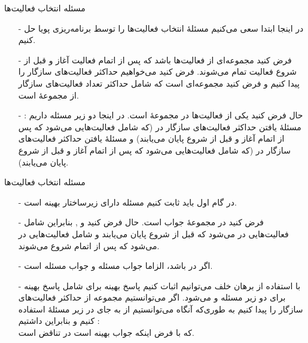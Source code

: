 \begin{frame}{‌مسئله انتخاب فعالیت‌ها}
\begin{itemize}\itemr
\item[-]
در اینجا ابتدا سعی می‌کنیم مسئلهٔ انتخاب فعالیت‌ها را توسط برنامه‌ریزی پویا حل کنیم.
\item[-]
 فرض کنید
مجموعه‌ای از فعالیت‌ها باشد که پس از اتمام فعالیت
آغاز
و قبل از شروع فعالیت
تمام می‌شوند.
فرض کنید می‌خواهیم حداکثر فعالیت‌های سازگار
را پیدا کنیم و فرض کنید
مجموعه‌ای است که شامل حداکثر تعداد فعالیت‌های سازگار از مجموعهٔ
است.
\item[-]
حال فرض کنید
یکی از فعالیت‌ها در مجموعهٔ
است. در اینجا دو زیر مسئله داریم : مسئلهٔ یافتن حداکثر فعالیت‌های سازگار در
(که شامل فعالیت‌هایی می‌شود که پس از اتمام
آغاز
و قبل از شروع
پایان می‌یابند) و مسئلهٔ یافتن حداکثر فعالیت‌های سازگار در
(که شامل فعالیت‌هایی می‌شود که پس از اتمام
آغاز
و قبل از شروع
پایان می‌یابند).
\end{itemize}
\end{frame}

\begin{frame}{‌مسئله انتخاب فعالیت‌ها}
\begin{itemize}\itemr
\item[-]
در گام اول باید ثابت کنیم مسئله دارای زیرساختار بهینه است.
\item[-]
 فرض کنید
در مجموعهٔ جواب
است.
حال فرض کنید
و
,
بنابراین
شامل فعالیت‌هایی در
می‌شود که قبل از شروع
پایان می‌یابند و
شامل فعالیت‌هایی در
می‌شود که پس از اتمام
شروع می‌شوند.
\item[-]
اگر
در 
باشد، الزاما
جواب مسئله
و
جواب مسئله
است.
\item[-]
با استفاده از برهان خلف می‌توانیم اثبات کنیم پاسخ بهینه برای
شامل پاسخ بهینه برای دو زیر مسئله
و
می‌شود. اگر می‌توانستیم مجموعه
از حداکثر فعالیت‌های سازگار
را پیدا کنیم به طوری‌که
آنگاه می‌توانستیم از
به جای
در زیر مسئلهٔ
استفاده کنیم و بنابراین داشتیم :\\
که با فرض اینکه
جواب بهینه است در تناقض است.
\end{itemize}
\end{frame}

